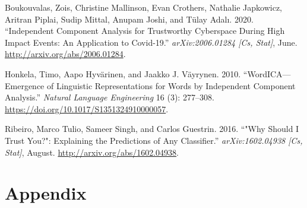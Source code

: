 \documentclass{article}
\begin{document}
\hypertarget{refs}{}
\leavevmode\hypertarget{ref-boukouvalas_independent_2020}{}%
Boukouvalas, Zois, Christine Mallinson, Evan Crothers, Nathalie
Japkowicz, Aritran Piplai, Sudip Mittal, Anupam Joshi, and Tülay Adalı.
2020. ``Independent Component Analysis for Trustworthy Cyberspace During
High Impact Events: An Application to Covid-19.'' \emph{arXiv:2006.01284
{[}Cs, Stat{]}}, June. \url{http://arxiv.org/abs/2006.01284}.

\leavevmode\hypertarget{ref-honkela_wordicaemergence_2010}{}%
Honkela, Timo, Aapo Hyvärinen, and Jaakko J. Väyrynen. 2010.
``WordICA---Emergence of Linguistic Representations for Words by
Independent Component Analysis.'' \emph{Natural Language Engineering} 16
(3): 277--308. \url{https://doi.org/10.1017/S1351324910000057}.

\leavevmode\hypertarget{ref-ribeiro_why_2016}{}%
Ribeiro, Marco Tulio, Sameer Singh, and Carlos Guestrin. 2016. ``"Why
Should I Trust You?": Explaining the Predictions of Any Classifier.''
\emph{arXiv:1602.04938 {[}Cs, Stat{]}}, August.
\url{http://arxiv.org/abs/1602.04938}.

\newpage

\hypertarget{appendix}{%
\section*{Appendix}\label{appendix}}

\label{sec:appendix}
\end{document}
